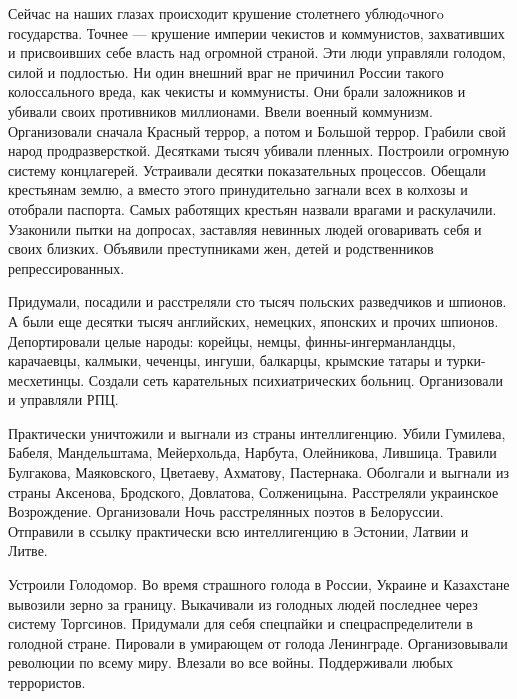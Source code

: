  
 
 
 
 

Сейчас на наших глазах происходит крушение столетнего ублюдoчногo государства.
Точнее — крушение империи чекистов и коммунистов, захвативших и присвоивших
себе власть над огромной страной. Эти люди управляли голодом, силой и
подлостью. Ни один внешний враг не причинил России такого колоссального вреда,
как чекисты и коммунисты. Они брали заложников и убивали своих противников
миллионами. Ввели военный коммунизм. Организовали сначала Красный террор, а
потом и Большой террор. Грабили свой народ продразверсткой. Десятками тысяч
убивали пленных. Построили огромную систему концлагерей. Устраивали десятки
показательных процессов. Обещали крестьянам землю, а вместо этого принудительно
загнали всех в колхозы и отобрали паспорта. Самых работящих крестьян назвали
врагами и раскулачили. Узаконили пытки на допросах, заставляя невинных людей
оговаривать себя и своих близких. Объявили преступниками жен, детей и
родственников репрессированных.

Придумали, посадили и расстреляли сто тысяч польских разведчиков и шпионов. А
были еще десятки тысяч английских, немецких, японских и прочих шпионов.
Депортировали целые народы: корейцы, немцы, финны-ингерманландцы, карачаевцы,
калмыки, чеченцы, ингуши, балкарцы, крымские татары и турки-месхетинцы. Создали
сеть карательных психиатрических больниц. Организовали и управляли РПЦ.

Практически уничтожили и выгнали из страны интеллигенцию. Убили Гумилева,
Бабеля, Мандельштама, Мейерхольда, Нарбута, Олейникова, Лившица. Травили
Булгакова, Маяковского, Цветаеву, Ахматову, Пастернака. Оболгали и выгнали из
страны Аксенова, Бродского, Довлатова, Солженицына. Расстреляли украинское
Возрождение. Организовали Ночь расстрелянных поэтов в Белоруссии. Отправили в
ссылку практически всю интеллигенцию в Эстонии, Латвии и Литве.

Устроили Голодомор. Во время страшного голода в России, Украине и Казахстане
вывозили зерно за границу. Выкачивали из голодных людей последнее через систему
Торгсинов. Придумали для себя спецпайки и спецраспределители в голодной стране.
Пировали в умирающем от голода Ленинграде. Организовывали революции по всему
миру. Влезали во все войны. Поддерживали любых террористов.

